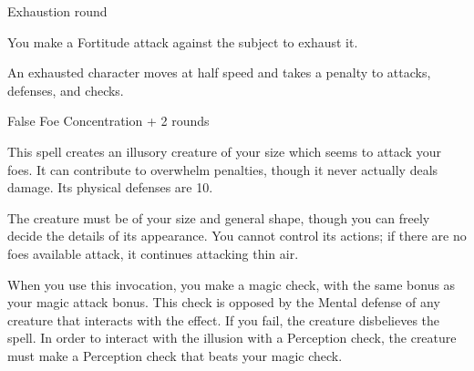 \begin{spellsection}{Exhaustion}
     round
    \begin{spelleffect}
        You make a Fortitude attack against the subject to exhaust it.
    \end{spelleffect}
    \begin{spellnotes}
        An exhausted character moves at half speed and takes a  penalty to attacks, defenses, and checks.
    \end{spellnotes}
\end{spellsection}

\begin{spellsection}{False Foe}
    \spellrng{\rngmed}
    \spelldur Concentration + 2 rounds
    \begin{spelleffect}
        This spell creates an illusory creature of your size which seems to attack your foes. It can contribute to overwhelm penalties, though it never actually deals damage. Its physical defenses are 10.

        The creature must be of your size and general shape, though you can freely decide the details of its appearance. You cannot control its actions; if there are no foes available attack, it continues attacking thin air.
    \end{spelleffect}
    \begin{spellnotes}
        When you use this invocation, you make a magic check, with the same bonus as your magic attack bonus. This check is opposed by the Mental defense of any creature that interacts with the effect. If you fail, the creature disbelieves the spell. In order to interact with the illusion with a Perception check, the creature must make a Perception check that beats your magic check.
    \end{spellnotes}
\end{spellsection}



